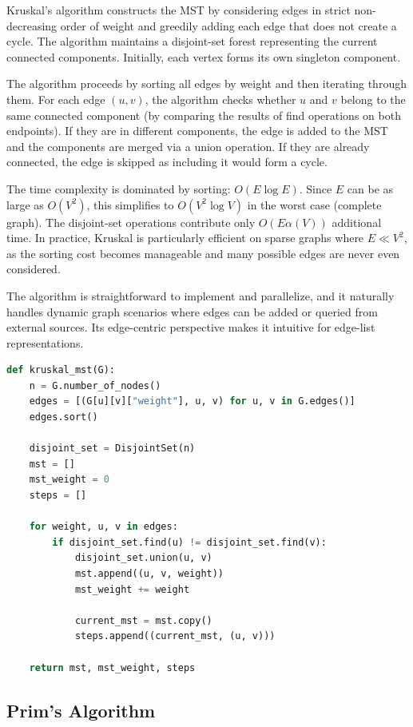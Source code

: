 ﻿\documentclass[12pt]{article}
\begin{document}
Kruskal's algorithm constructs the MST by considering edges in strict non-decreasing order of weight and greedily adding each edge that does not create a cycle. The algorithm maintains a disjoint-set forest representing the current connected components. Initially, each vertex forms its own singleton component.

The algorithm proceeds by sorting all edges by weight and then iterating through them. For each edge $(u, v)$, the algorithm checks whether $u$ and $v$ belong to the same connected component (by comparing the results of find operations on both endpoints). If they are in different components, the edge is added to the MST and the components are merged via a union operation. If they are already connected, the edge is skipped as including it would form a cycle.

The time complexity is dominated by sorting: $O(E \log E)$. Since $E$ can be as large as $O(V^2)$, this simplifies to $O(V^2 \log V)$ in the worst case (complete graph). The disjoint-set operations contribute only $O(E \alpha(V))$ additional time. In practice, Kruskal is particularly efficient on sparse graphs where $E \ll V^2$, as the sorting cost becomes manageable and many possible edges are never even considered.

The algorithm is straightforward to implement and parallelize, and it naturally handles dynamic graph scenarios where edges can be added or queried from external sources. Its edge-centric perspective makes it intuitive for edge-list representations.

\begin{lstlisting}[language=Python, caption={Kruskal's Algorithm (impl.py)}, label={lst:kruskal-py}]
def kruskal_mst(G):
    n = G.number_of_nodes()
    edges = [(G[u][v]["weight"], u, v) for u, v in G.edges()]
    edges.sort()
    
    disjoint_set = DisjointSet(n)
    mst = []
    mst_weight = 0
    steps = []
    
    for weight, u, v in edges:
        if disjoint_set.find(u) != disjoint_set.find(v):
            disjoint_set.union(u, v)
            mst.append((u, v, weight))
            mst_weight += weight
            
            current_mst = mst.copy()
            steps.append((current_mst, (u, v)))
    
    return mst, mst_weight, steps
\end{lstlisting}

\subsection{Prim's Algorithm}
\end{document}
